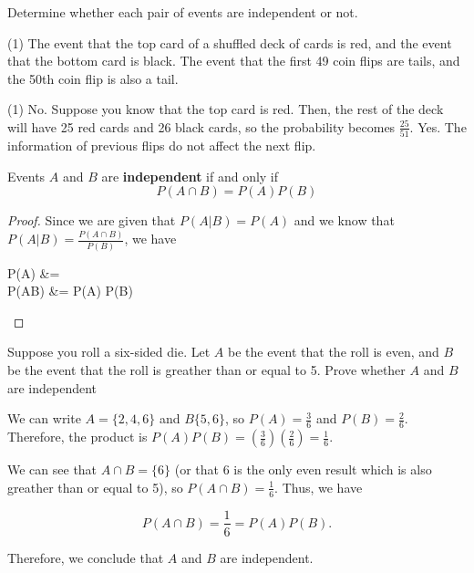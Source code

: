 \begin{frame}[t]
\begin{ex}
Determine whether each pair of events are independent or not.
\begin{tasks}(1)
\task The event that the top card of a shuffled deck of cards is red, and the event that the bottom card is black.
\task The event that the first 49 coin flips are tails, and the 50th coin flip is also a tail.
\end{tasks}
\end{ex}
\begin{sol}
\begin{tasks}(1)
\task No. Suppose you know that the top card is red. Then, the rest of the deck will have 25 red cards and 26 black cards, so the probability becomes $\frac{25}{51}$.
\task Yes. The information of previous flips do not affect the next flip.
\end{tasks}
\end{sol}
\end{frame}

\begin{frame}[t]
\begin{thm}{}{}
Events $A$ and $B$ are \textbf{independent} if and only if
\begin{equation}
P(A \cap B) = P(A) P(B)
\end{equation}
\end{thm}
\begin{proof}
Since we are given that $P(A|B) = P(A)$ and we know that $P(A|B) = \frac{P(A\cap B)}{P(B)}$, we have
\begin{eq*}
P(A) &=  \\
P(A\cap B) &= P(A) P(B)
\end{eq*}
\end{proof}
\end{frame}

\begin{frame}[t]
\begin{ex}
Suppose you roll a six-sided die. Let $A$ be the event that the roll is even, and $B$ be the event that the roll is greather than or equal to 5. Prove whether $A$ and $B$ are independent 
\end{ex}
\begin{sol}
We can write $A = \{2,4,6\}$ and $B  \{5,6\}$, so $P(A) = \frac{3}{6}$ and $P(B) = \frac{2}{6}$. Therefore, the product is $P(A) P(B) = \left( \frac{3}{6} \right) \left( \frac{2}{6} \right) = \frac{1}{6}$.
\medskip

We can see that $A \cap B = \{6\}$ (or that 6 is the only even result which is also greather than or equal to 5), so $P(A \cap B) = \frac{1}{6}$. Thus, we have

\[P(A \cap B) = \frac{1}{6} = P(A)P(B).\]

Therefore, we conclude that $A$ and $B$ are independent.
\end{sol}
\end{frame}

